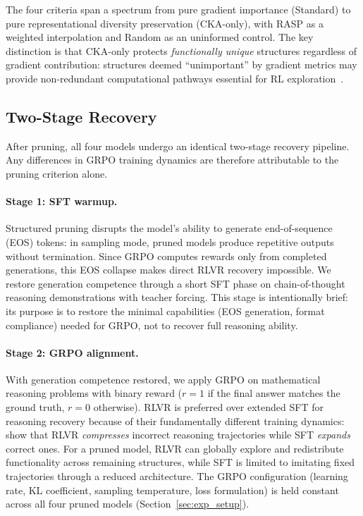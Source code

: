 The four criteria span a spectrum from pure gradient importance (Standard) to pure representational diversity preservation (CKA-only), with RASP as a weighted interpolation and Random as an uninformed control.
The key distinction is that CKA-only protects \emph{functionally unique} structures regardless of gradient contribution: structures deemed ``unimportant'' by gradient metrics may provide non-redundant computational pathways essential for RL exploration~\citep{rlsqueezes2026}.

\subsection{Two-Stage Recovery}
\label{sec:recovery}

After pruning, all four models undergo an identical two-stage recovery pipeline. Any differences in GRPO training dynamics are therefore attributable to the pruning criterion alone.

\paragraph{Stage 1: SFT warmup.}
Structured pruning disrupts the model's ability to generate end-of-sequence (EOS) tokens: in sampling mode, pruned models produce repetitive outputs without termination.
Since GRPO computes rewards only from completed generations, this EOS collapse makes direct RLVR recovery impossible.
We restore generation competence through a short SFT phase on chain-of-thought reasoning demonstrations with teacher forcing.
This stage is intentionally brief: its purpose is to restore the minimal capabilities (EOS generation, format compliance) needed for GRPO, not to recover full reasoning ability.

\paragraph{Stage 2: GRPO alignment.}
With generation competence restored, we apply GRPO on mathematical reasoning problems with binary reward ($r{=}1$ if the final answer matches the ground truth, $r{=}0$ otherwise).
RLVR is preferred over extended SFT for reasoning recovery because of their fundamentally different training dynamics: \citet{rlsqueezes2026} show that RLVR \emph{compresses} incorrect reasoning trajectories while SFT \emph{expands} correct ones.
For a pruned model, RLVR can globally explore and redistribute functionality across remaining structures, while SFT is limited to imitating fixed trajectories through a reduced architecture.
The GRPO configuration (learning rate, KL coefficient, sampling temperature, loss formulation) is held constant across all four pruned models (Section~\ref{sec:exp_setup}).


